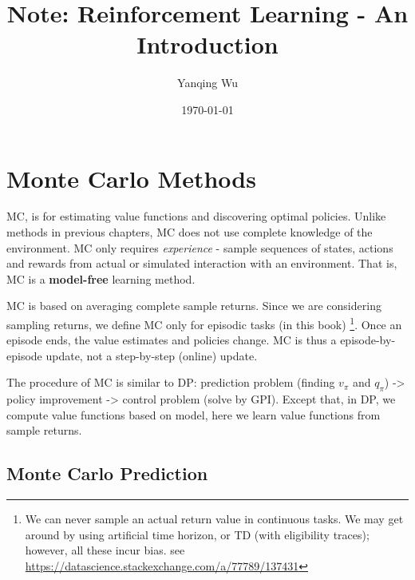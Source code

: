 \documentclass[lang=en,mode=geye,device=normal,color=blue,14pt]{elegantnote}
\title{Note: Reinforcement Learning - An Introduction}
\author{Yanqing Wu}
\date{\today}
\DeclareMathOperator*{\1}{\mathbbm{1}}
\begin{document}
\maketitle

\setlength{\parindent}{0pt}
\tableofcontents














\newpage
\section{Monte Carlo Methods}

MC, is for estimating value functions and discovering optimal policies. Unlike methods in previous chapters, MC does not use complete knowledge of the environment. MC only requires \textit{experience} - sample sequences of states, actions and rewards from actual or simulated interaction with an environment. That is, MC is a \textbf{model-free} learning method.

MC is based on averaging complete sample returns. Since we are considering sampling returns, we define MC only for episodic tasks (in this book) \footnote{We can never sample an actual return value in continuous tasks. We may get around by using artificial time horizon, or TD (with eligibility traces); however, all these incur bias. see \url{https://datascience.stackexchange.com/a/77789/137431}}. Once an episode ends, the value estimates and policies change. MC is thus a episode-by-episode update, not a step-by-step (online) update.

The procedure of MC is similar to DP: prediction problem (finding $v_\pi$ and $q_\pi$) -> policy improvement -> control problem (solve by GPI). Except that, in DP, we compute value functions based on model, here we learn value functions from sample returns.

\subsection{Monte Carlo Prediction}
\end{document}
